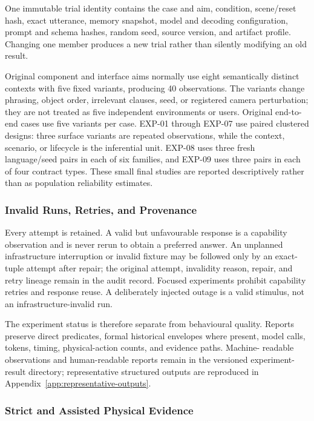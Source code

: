\documentclass{article}
\begin{document}
One immutable trial identity contains the case and aim, condition, scene/reset
hash, exact utterance, memory snapshot, model and decoding configuration, prompt
and schema hashes, random seed, source version, and artifact profile. Changing
one member produces a new trial rather than silently modifying an old result.

Original component and interface aims normally use eight semantically distinct
contexts with five fixed variants, producing 40 observations. The variants
change phrasing, object order, irrelevant clauses, seed, or registered camera
perturbation; they are not treated as five independent environments or users.
Original end-to-end cases use five variants per case. EXP-01 through EXP-07 use
paired clustered designs: three surface variants are repeated observations,
while the context, scenario, or lifecycle is the inferential unit. EXP-08 uses
three fresh language/seed pairs in each of six families, and EXP-09 uses three
pairs in each of four contract types. These small final studies are reported
descriptively rather than as population reliability estimates.

\subsubsection{Invalid Runs, Retries, and Provenance}

Every attempt is retained. A valid but unfavourable response is a capability
observation and is never rerun to obtain a preferred answer. An unplanned
infrastructure interruption or invalid fixture may be followed only by an
exact-tuple attempt after repair; the original attempt, invalidity reason,
repair, and retry lineage remain in the audit record. Focused experiments
prohibit capability retries and response reuse. A deliberately injected outage
is a valid stimulus, not an infrastructure-invalid run.

The experiment status is therefore separate from behavioural quality. Reports
preserve direct predicates, formal historical envelopes where present, model
calls, tokens, timing, physical-action counts, and evidence paths. Machine-
readable observations and human-readable reports remain in the versioned
experiment-result directory; representative structured outputs are reproduced
in Appendix~\ref{app:representative-outputs}.

\subsubsection{Strict and Assisted Physical Evidence}
\end{document}
